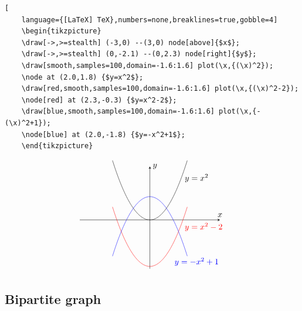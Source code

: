\documentclass[lualatex]{jlreq}
\begin{document}
\begin{lstlisting}[
    language={[LaTeX] TeX},numbers=none,breaklines=true,gobble=4]
    \begin{tikzpicture}
    \draw[->,>=stealth] (-3,0) --(3,0) node[above]{$x$};
    \draw[->,>=stealth] (0,-2.1) --(0,2.3) node[right]{$y$};
    \draw[smooth,samples=100,domain=-1.6:1.6] plot(\x,{(\x)^2});
    \node at (2.0,1.8) {$y=x^2$};
    \draw[red,smooth,samples=100,domain=-1.6:1.6] plot(\x,{(\x)^2-2});
    \node[red] at (2.3,-0.3) {$y=x^2-2$};
    \draw[blue,smooth,samples=100,domain=-1.6:1.6] plot(\x,{-(\x)^2+1});
    \node[blue] at (2.0,-1.8) {$y=-x^2+1$};
    \end{tikzpicture}
\end{lstlisting}
\[
    \begin{tikzpicture}
    \draw[->,>=stealth] (-3,0) --(3,0) node[above]{$x$};
    \draw[->,>=stealth] (0,-2.1) --(0,2.3) node[right]{$y$};
    \draw[smooth,samples=100,domain=-1.6:1.6] plot(\x,{(\x)^2});
    \node at (2.0,1.8) {$y=x^2$};
    \draw[red,smooth,samples=100,domain=-1.6:1.6] plot(\x,{(\x)^2-2});
    \node[red] at (2.3,-0.3) {$y=x^2-2$};
    \draw[blue,smooth,samples=100,domain=-1.6:1.6] plot(\x,{-(\x)^2+1});
    \node[blue] at (2.0,-1.8) {$y=-x^2+1$};
    \end{tikzpicture}
\]

\subsection{Bipartite graph}
\end{document}
